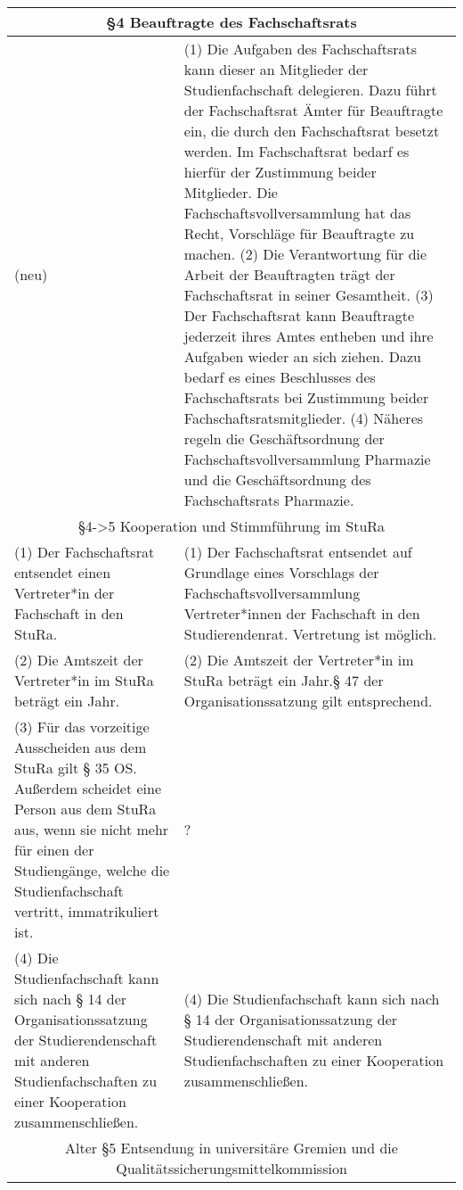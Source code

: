 {\begin{longtable}{|p{7.5cm}|p{7.5cm}|}
        \multicolumn{2}{|c|}{§4 Beauftragte des Fachschaftsrats}\\\hline
        (neu) &
        (1) Die Aufgaben des Fachschaftsrats kann dieser an Mitglieder der Studienfachschaft delegieren.
        Dazu führt der Fachschaftsrat Ämter für Beauftragte ein, die durch den Fachschaftsrat besetzt werden.
        Im Fachschaftsrat bedarf es hierfür der Zustimmung beider  Mitglieder.
        Die Fachschaftsvollversammlung hat das Recht, Vorschläge für Beauftragte zu machen.\newline
        (2) Die Verantwortung für die Arbeit der Beauftragten trägt der Fachschaftsrat in seiner Gesamtheit.\newline
        (3) Der Fachschaftsrat kann Beauftragte jederzeit ihres Amtes entheben und ihre Aufgaben wieder an sich ziehen.
        Dazu bedarf es eines Beschlusses des Fachschaftsrats bei Zustimmung beider Fachschaftsratsmitglieder.\newline
        (4) Näheres regeln die Geschäftsordnung der Fachschaftsvollversammlung Pharmazie und die Geschäftsordnung des
        Fachschaftsrats Pharmazie.\\\hline
        \multicolumn{2}{|c|}{§4->5 Kooperation und Stimmführung im StuRa}\\\hline
        (1) Der Fachschaftsrat entsendet einen Vertreter*in der Fachschaft in den StuRa.&
        (1) Der Fachschaftsrat entsendet auf Grundlage eines Vorschlags der Fachschaftsvollversammlung
        Vertreter*innen der Fachschaft in den Studierendenrat. Vertretung ist möglich.\\
        (2) Die Amtszeit der Vertreter*in im StuRa beträgt ein Jahr.&
        (2) Die Amtszeit der Vertreter*in im StuRa beträgt ein Jahr.§ 47 der Organisationssatzung gilt entsprechend.\\
        (3) Für das vorzeitige Ausscheiden aus dem StuRa gilt § 35 OS. Außerdem scheidet eine Person aus dem StuRa aus,
        wenn sie nicht mehr für einen der Studiengänge, welche die Studienfachschaft vertritt, immatrikuliert ist.&
        ?\\
        (4) Die Studienfachschaft kann sich nach § 14 der Organisationssatzung der Studierendenschaft mit anderen
        Studienfachschaften zu einer Kooperation zusammenschließen.&
        (4) Die Studienfachschaft kann sich nach § 14 der Organisationssatzung der Studierendenschaft
        mit anderen Studienfachschaften zu einer Kooperation zusammenschließen.\\
        \hline
        \multicolumn{2}{|c|}{Alter §5 Entsendung in universitäre Gremien und die Qualitätssicherungsmittelkommission}\\\hline

\end{longtable}}
